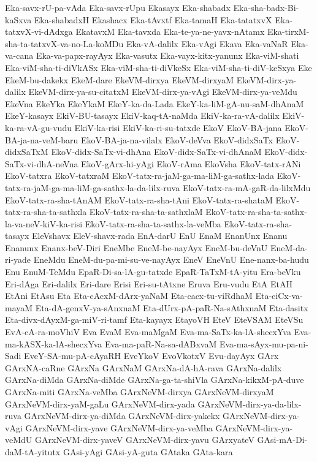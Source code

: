 {Eka-savx-rU-pa-vAda
Eka-savx-rUpu
Ekasayx
Eka-shabadx
Eka-sha-badx-Bi-kaSxva
Eka-shabadxH
Ekashacx
Eka-tAvxtf
Eka-tamaH
Eka-tatatxvX
Eka-tatxvX-vi-dAdxga
EkatavxM
Eka-tavxda
Eka-te-ya-ne-yavx-nAtamx
Eka-tirxM-sha-ta-tatxvX-va-no-La-koMDu
Eka-vA-dalilx
Eka-vAgi
Ekava
Eka-vaNaR
Eka-va-cana
Eka-va-papx-rayAyx
Eka-vasutx
Eka-vayx-kitx-yanunx
Eka-viM-shati
Eka-viM-sha-ti-diVkASx
Eka-viM-sha-ti-diVkeSx
Eka-viM-sha-ti-diV-keSxya
Eke
EkeM-bu-dakekx
EkeM-dare
EkeVM-dirxya
EkeVM-dirxyaM
EkeVM-dirx-ya-dalilx
EkeVM-dirx-ya-su-citatxM
EkeVM-dirx-ya-vAgi
EkeVM-dirx-ya-veMdu
EkeVna
EkeYka
EkeYkaM
EkeY-ka-da-Lada
EkeY-ka-liM-gA-nu-saM-dhAnaM
EkeY-kasayx
EkiV-BU-tasayx
EkiV-kaq-tA-naMda
EkiV-ka-ra-vA-dalilx
EkiV-ka-ra-vA-gu-vudu
EkiV-ka-risi
EkiV-ka-ri-su-tatxde
EkoV
EkoV-BA-jana
EkoV-BA-ja-na-veM-baru
EkoV-BA-ja-na-vilalx
EkoV-deVva
EkoV-didxSaTx
EkoV-didxSaTxM
EkoV-didx-SaTx-vi-dhAna
EkoV-didx-SaTx-vi-dhAnaM
EkoV-didx-SaTx-vi-dhA-neVna
EkoV-gArx-hi-yAgi
EkoV-rAma
EkoVsha
EkoV-tatx-rANi
EkoV-tatxra
EkoV-tatxraM
EkoV-tatx-ra-jaM-ga-ma-liM-ga-sathx-lada
EkoV-tatx-ra-jaM-ga-ma-liM-ga-sathx-la-da-lilx-ruva
EkoV-tatx-ra-mA-gaR-da-lilxMdu
EkoV-tatx-ra-sha-tAnAM
EkoV-tatx-ra-sha-tAni
EkoV-tatx-ra-shataM
EkoV-tatx-ra-sha-ta-sathxla
EkoV-tatx-ra-sha-ta-sathxlaM
EkoV-tatx-ra-sha-ta-sathx-la-va-neV-kiV-ka-risi
EkoV-tatx-ra-sha-ta-sathx-la-veMba
EkoV-tatx-ra-sha-tasayx
EleVshavx
EleV-shavx-rada
EnA-darU
EnU
EnaM
EnanUnx
Enanu
Enanunx
Enanx-beV-Diri
EneMbe
EneM-be-nayAyx
EneM-bu-deVnU
EneM-da-ri-yade
EneMdu
EneM-du-pa-mi-su-ve-nayAyx
EneV
EneVnU
Ene-nanx-ba-hudu
Enu
EnuM-TeMdu
EpaR-Di-sa-lA-gu-tatxde
EpaR-TaTxM-tA-yitu
Era-beVku
Eri-dAga
Eri-dalilx
Eri-dare
Erisi
Eri-su-tAtxne
Eruva
Eru-vudu
EtA
EtAH
EtAni
EtAsu
Eta
Eta-cAcxM-dArx-yaNaM
Eta-cacx-tu-viRdhaM
Eta-ciCx-va-mayaM
Eta-dA-genxV-ya-sAnxnaM
Eta-dUrx-pA-paR-Na-sAthxnaM
Eta-dasitx
Eta-divx-dAyxM-ga-miV-ri-tamf
Eta-kayayx
EtayoVH
EteV
EteVSAM
EteVSu
EvA-cA-ra-moVhiV
Eva
EvaM
Eva-maMgaM
Eva-ma-SaTx-ka-lA-shecxYva
Eva-ma-kASX-ka-lA-shecxYva
Eva-ma-paR-Na-sa-dABxvaM
Eva-ma-sAyx-mu-pa-ni-Sadi
EveY-SA-mu-pA-cAyaRH
EveYkoV
EvoVkotxV
Evu-dayAyx
GArx
GArxNA-caRne
GArxNa
GArxNaM
GArxNa-dA-hA-rava
GArxNa-dalilx
GArxNa-diMda
GArxNa-diMde
GArxNa-ga-ta-shiVla
GArxNa-kikxM-pA-duve
GArxNa-miti
GArxNa-veMba
GArxNeVM-dirxya
GArxNeVM-dirxyaM
GArxNeVM-dirx-yaM-gaLu
GArxNeVM-dirx-yada
GArxNeVM-dirx-ya-da-lilx-ruva
GArxNeVM-dirx-ya-diMda
GArxNeVM-dirx-yakekx
GArxNeVM-dirx-ya-vAgi
GArxNeVM-dirx-yave
GArxNeVM-dirx-ya-veMba
GArxNeVM-dirx-ya-veMdU
GArxNeVM-dirx-yaveV
GArxNeVM-dirx-yavu
GArxyateV
GAsi-mA-Di-daM-tA-yitutx
GAsi-yAgi
GAsi-yA-guta
GAtaka
GAta-kara
}
